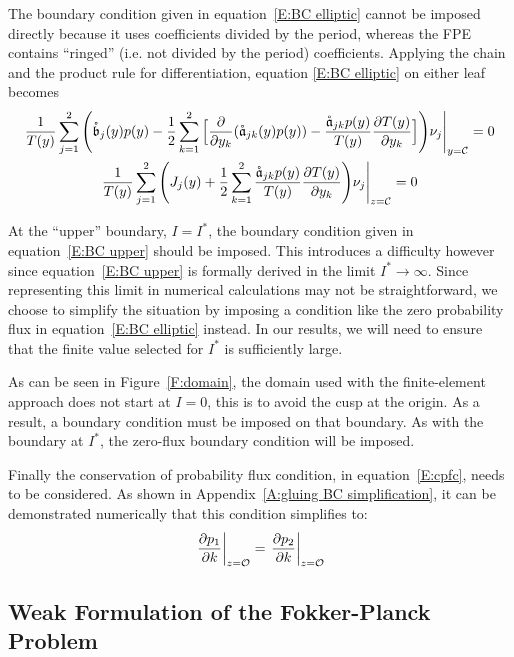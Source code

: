 The boundary condition given in equation~\eqref{E:BC elliptic} cannot be imposed directly because it uses coefficients divided by the period, whereas the FPE contains ``ringed'' (i.e. not divided by the period) coefficients. Applying the chain and the product rule for differentiation, equation \eqref{E:BC elliptic} on either leaf becomes
\begin{multline}
\frac{1}{T(y)} \sum_{j=1}^2 \Bigg(\mathring{\mathfrak{b}}_j(y) p(y) - \frac12 \sum_{k=1}^2 \Big[\frac{\partial}{\partial y_k} (\mathring{\mathfrak{a}}_{jk}(y) p(y)) - \frac{\mathring{\mathfrak{a}}_{jk} p(y)}{T(y)} \frac{\partial T(y)}{\partial y_k}\Big]\Bigg) \nu_j \Bigg\rvert_{y = \mathcal C} = 0\\
\frac{1}{T(y)} \sum_{j=1}^2 \Bigg(J_j(y) + \frac12 \sum_{k=1}^2 \frac{\mathring{\mathfrak{a}}_{jk} p(y)}{T(y)} \frac{\partial T(y)}{\partial y_k}\Bigg) \nu_j \Bigg\rvert_{z = \mathcal C} = 0
\label{E:BC elliptic 2}
\end{multline}

At the ``upper'' boundary, $I = I^*$, the boundary condition given in equation~\eqref{E:BC upper} should be imposed. This introduces a difficulty however since equation~\eqref{E:BC upper} is formally derived in the limit $I^* \to \infty$. Since representing this limit in numerical calculations may not be straightforward, we choose to simplify the situation by imposing a condition like the zero probability flux in equation~\eqref{E:BC elliptic} instead. In our results, we will need to ensure that the finite value selected for $I^*$ is sufficiently large.

As can be seen in Figure~\ref{F:domain}, the domain used with the finite-element approach does not start at $I=0$, this is to avoid the cusp at the origin. As a result, a boundary condition must be imposed on that boundary. As with the boundary at $I^*$, the zero-flux boundary condition will be imposed.

Finally the conservation of probability flux condition, in equation~\eqref{E:cpfc}, needs to be considered. As shown in Appendix~\ref{A:gluing BC simplification}, it can be demonstrated numerically that this condition simplifies to:
\begin{equation}
\eval{\frac{\partial p_1}{\partial k}}_{z = \mathcal{O}} = \eval{\frac{\partial p_2}{\partial k}}_{z = \mathcal{O}}
\label{E:cpfc simplified}
\end{equation}

\subsection{Weak Formulation of the Fokker-Planck Problem}

